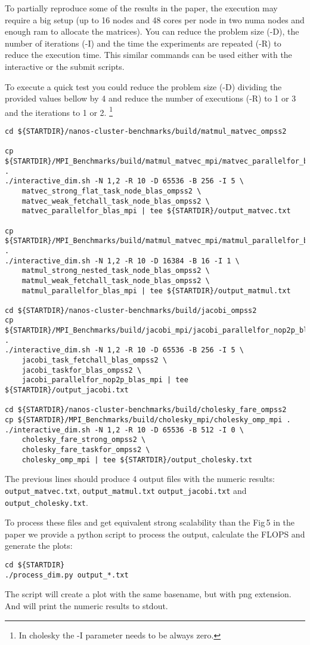 \documentclass{article}
\newcommand{\code}[1]{\texttt{#1}}
\begin{document}
To partially reproduce some of the results in the paper, the execution
may require a big setup (up to 16 nodes and 48 cores per node in two
numa nodes and enough ram to allocate the matrices). You can reduce
the problem size (-D), the number of iterations (-I) and the time the
experiments are repeated (-R) to reduce the execution time. This
similar commands can be used either with the interactive or the submit
scripts.

To execute a quick test you could reduce the problem size (-D)
dividing the provided values bellow by 4 and reduce the number of
executions (-R) to 1 or 3 and the iterations to 1 or 2. \footnote{In
  cholesky the -I parameter needs to be always zero.}

\begin{lstlisting}
cd ${STARTDIR}/nanos-cluster-benchmarks/build/matmul_matvec_ompss2

cp ${STARTDIR}/MPI_Benchmarks/build/matmul_matvec_mpi/matvec_parallelfor_blas_mpi .
./interactive_dim.sh -N 1,2 -R 10 -D 65536 -B 256 -I 5 \
	matvec_strong_flat_task_node_blas_ompss2 \
	matvec_weak_fetchall_task_node_blas_ompss2 \
	matvec_parallelfor_blas_mpi | tee ${STARTDIR}/output_matvec.txt

cp ${STARTDIR}/MPI_Benchmarks/build/matmul_matvec_mpi/matmul_parallelfor_blas_mpi .
./interactive_dim.sh -N 1,2 -R 10 -D 16384 -B 16 -I 1 \
	matmul_strong_nested_task_node_blas_ompss2 \
	matmul_weak_fetchall_task_node_blas_ompss2 \
	matmul_parallelfor_blas_mpi | tee ${STARTDIR}/output_matmul.txt

cd ${STARTDIR}/nanos-cluster-benchmarks/build/jacobi_ompss2
cp ${STARTDIR}/MPI_Benchmarks/build/jacobi_mpi/jacobi_parallelfor_nop2p_blas_mpi .
./interactive_dim.sh -N 1,2 -R 10 -D 65536 -B 256 -I 5 \
	jacobi_task_fetchall_blas_ompss2 \
	jacobi_taskfor_blas_ompss2 \
	jacobi_parallelfor_nop2p_blas_mpi | tee ${STARTDIR}/output_jacobi.txt

cd ${STARTDIR}/nanos-cluster-benchmarks/build/cholesky_fare_ompss2
cp ${STARTDIR}/MPI_Benchmarks/build/cholesky_mpi/cholesky_omp_mpi .
./interactive_dim.sh -N 1,2 -R 10 -D 65536 -B 512 -I 0 \
	cholesky_fare_strong_ompss2 \
	cholesky_fare_taskfor_ompss2 \
	cholesky_omp_mpi | tee ${STARTDIR}/output_cholesky.txt
\end{lstlisting}

The previous lines should produce 4 output files with the numeric
results: \code{output\_matvec.txt}, \code{output\_matmul.txt}
\code{output\_jacobi.txt} and \code{output\_cholesky.txt}.

To process these files and get equivalent strong scalability than the
Fig\,5 in the paper we provide a python script to process the output,
calculate the FLOPS and generate the plots:

\begin{lstlisting}
cd ${STARTDIR}
./process_dim.py output_*.txt
\end{lstlisting}

The script will create a plot with the same basename, but with png
extension. And will print the numeric results to stdout.
\end{document}
